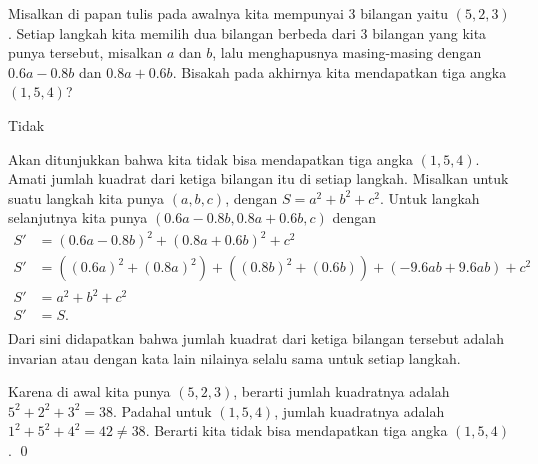 \documentclass[12pt]{scrartcl}
\begin{document}
	\begin{soalbaru}
		Misalkan di papan tulis pada awalnya kita mempunyai 3 bilangan yaitu $(5,2,3)$. Setiap langkah kita memilih dua bilangan berbeda dari 3 bilangan yang kita punya tersebut, misalkan $a$ dan $b$, lalu menghapusnya  masing-masing dengan $0.6a-0.8b$ dan $0.8a+0.6b$. Bisakah pada akhirnya kita mendapatkan tiga angka $(1,5,4)$?
		\begin{jawaban}
		Tidak
		\end{jawaban}
		\begin{solusi}
		Akan ditunjukkan bahwa kita tidak bisa mendapatkan tiga angka $(1,5,4)$.
		Amati jumlah kuadrat dari ketiga bilangan itu di setiap langkah. Misalkan untuk suatu langkah kita punya $(a,b,c)$, dengan $S=a^2+b^2+c^2$. Untuk langkah selanjutnya kita punya $(0.6a-0.8b,0.8a+0.6b,c)$ dengan 
		\vspace{-8pt}
		\begin{equation*}
		\begin{split}
		S' &= (0.6a-0.8b)^2+(0.8a+0.6b)^2+c^2\\
		S' &= ((0.6a)^2+(0.8a)^2)+((0.8b)^2+(0.6b))+(-9.6ab+9.6ab)+c^2\\
		S' &= a^2+b^2+c^2\\
		S' &= S.\\[-8pt]
		\end{split}
		\end{equation*}
		 Dari sini didapatkan bahwa jumlah kuadrat dari ketiga bilangan tersebut adalah invarian atau dengan kata lain nilainya selalu sama untuk setiap langkah. 
		
		Karena di awal kita punya $(5,2,3)$, berarti jumlah kuadratnya adalah $5^2+2^2+3^2=38$. Padahal untuk $(1,5,4)$, jumlah kuadratnya adalah $1^2+5^2+4^2=42 \neq 38$. Berarti kita tidak bisa mendapatkan tiga angka $(1,5,4)$. \qed
		\end{solusi}
	\end{soalbaru}
	
\end{document}

